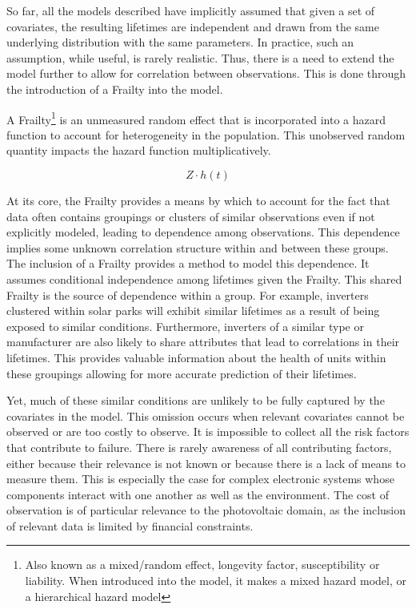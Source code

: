 So far, all the models described have implicitly assumed that given a set of covariates, the resulting lifetimes are independent and drawn from the same underlying distribution with the same parameters. In practice, such an assumption, while useful, is rarely realistic. Thus, there is a need to extend the model further to allow for correlation between observations. This is done through the introduction of a Frailty into the model.

A Frailty\footnote{Also known as a mixed/random effect, longevity factor, susceptibility or liability. When introduced into the model, it makes a mixed hazard model, or a hierarchical hazard model} is an unmeasured random effect that is incorporated into a hazard function to account for heterogeneity in the population\cite{Hosmer2008}. This unobserved random quantity impacts the hazard function multiplicatively.

$$ Z\cdot h(t) $$

At its core, the Frailty provides a means by which to account for the fact that data often contains groupings or clusters of similar observations even if not explicitly modeled, leading to dependence among observations. This dependence implies some unknown correlation structure within and between these groups. The inclusion of a Frailty provides a method to model this dependence. It assumes conditional independence among lifetimes given the Frailty. This shared Frailty is the source of dependence within a group\cite{Wienke2010}. For example, inverters clustered within solar parks will exhibit similar lifetimes as a result of being exposed to similar conditions. Furthermore, inverters of a similar type or manufacturer are also likely to share attributes that lead to correlations in their lifetimes. This provides valuable information about the health of units within these groupings allowing for more accurate prediction of their lifetimes.

Yet, much of these similar conditions are unlikely to be fully captured by the covariates in the model. This omission occurs when relevant covariates cannot be observed or are too costly to observe. It is impossible to collect all the risk factors that contribute to failure. There is rarely awareness of all contributing factors, either because their relevance is not known or because there is a lack of means to measure them. This is especially the case for complex electronic systems whose components interact with one another as well as the environment. The cost of observation is of particular relevance to the photovoltaic domain, as the inclusion of relevant data is limited by financial constraints.

